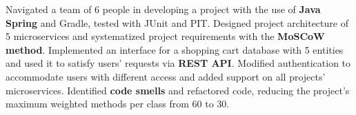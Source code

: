     \resumeItemListStart
        \subItemOfItem
        {Navigated a team of 6 people in developing a project with the use of \textbf{Java Spring} and Gradle, tested with JUnit and PIT.}
        \subItemOfItem
        {Designed project architecture of 5 microservices and systematized project requirements with the \textbf{MoSCoW method}.}
        \subItemOfItem
        {Implemented an interface for a shopping cart database with 5 entities and used it to satisfy users’ requests via \textbf{REST API}.}
        \subItemOfItem
        {Modified authentication to accommodate users with different access and added support on all projects' microservices.}
        \subItemOfItem
        {Identified \textbf{code smells} and refactored code, reducing the project's maximum weighted methods per class from 60 to 30.}
    \resumeItemListEnd